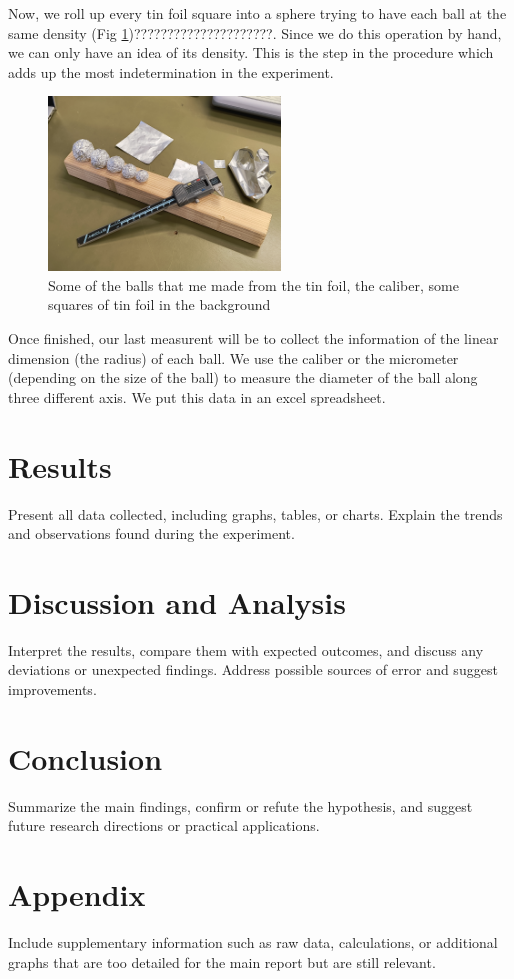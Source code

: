 \documentclass[a4paper,12pt]{article}
\begin{document}
Now, we roll up every tin foil square into a sphere trying to have each ball at the same density (Fig \ref{fig:tf_balls})?????????????????????. 
Since we do this operation by hand, we can only have an idea of its density. This is the step in the 
procedure which adds up the most indetermination in the experiment.

\begin{figure}[h]
    \centering
    \includegraphics[width = 0.55\textwidth]{Tin_foil_balls.jpg}
    \caption{Some of the balls that me made from the tin foil, the caliber, some squares of tin foil in the background}
    \label{fig:tf_balls}
\end{figure}

Once finished, our last measurent will be to collect the information of the linear dimension (the radius) 
of each ball. We use the caliber or the micrometer (depending on the size of the ball) to measure the diameter 
of the ball along three different axis. We put this data in an excel spreadsheet.

\section{Results}
Present all data collected, including graphs, tables, or charts. Explain the trends and observations found during the experiment.

\section{Discussion and Analysis}
Interpret the results, compare them with expected outcomes, and discuss any deviations or unexpected findings. Address possible sources of error and suggest improvements.

\section{Conclusion}
Summarize the main findings, confirm or refute the hypothesis, and suggest future research directions or practical applications.

\section{Appendix}
Include supplementary information such as raw data, calculations, or additional graphs that are too detailed for the main report but are still relevant.

\printbibliography
\end{document}
